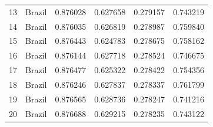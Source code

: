 \begin{tabular}{rlrrrr}
13 & Brazil & 0.876028 & 0.627658 & 0.279157 & 0.743219 \\
14 & Brazil & 0.876035 & 0.626819 & 0.278987 & 0.759840 \\
15 & Brazil & 0.876443 & 0.624783 & 0.278675 & 0.758162 \\
16 & Brazil & 0.876144 & 0.627718 & 0.278524 & 0.746675 \\
17 & Brazil & 0.876477 & 0.625322 & 0.278422 & 0.754356 \\
18 & Brazil & 0.876246 & 0.627837 & 0.278337 & 0.761799 \\
19 & Brazil & 0.876565 & 0.628736 & 0.278247 & 0.741216 \\
20 & Brazil & 0.876688 & 0.629215 & 0.278235 & 0.743122 \\
\bottomrule
\end{tabular}
